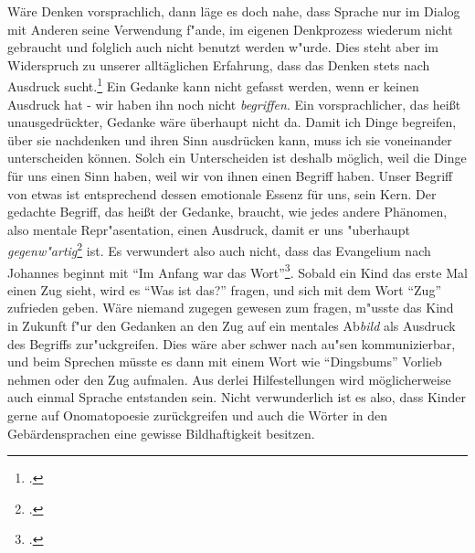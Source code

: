 \documentclass[a4paper, 12pt]{article}
\begin{document}
\begin{onehalfspace}
Wäre Denken vorsprachlich, dann läge es doch nahe, dass Sprache nur im Dialog mit Anderen seine Verwendung f"ande, im eigenen Denkprozess wiederum nicht gebraucht und folglich auch nicht benutzt werden w"urde. Dies steht aber im Widerspruch zu unserer alltäglichen Erfahrung, dass das Denken stets nach Ausdruck sucht.\footnote{\Cite[Vgl.][S. 216]{merleau1966phanomenologie}.} Ein Gedanke kann nicht gefasst werden, wenn er keinen Ausdruck hat - wir haben ihn noch nicht \emph{begriffen}. Ein vorsprachlicher, das heißt unausgedrückter, Gedanke wäre überhaupt nicht da. Damit ich Dinge begreifen, über sie nachdenken und ihren Sinn ausdrücken kann, muss ich sie voneinander unterscheiden können. Solch ein Unterscheiden ist deshalb möglich, weil die Dinge für uns einen Sinn haben, weil wir von ihnen einen Begriff haben. Unser Begriff von etwas ist entsprechend dessen emotionale Essenz für uns, sein Kern. Der gedachte Begriff, das heißt der Gedanke, braucht, wie jedes andere Phänomen, also mentale Repr"asentation, einen Ausdruck, damit er uns "uberhaupt \emph{gegenw"artig}\footnote{\cite[Vgl.][S. 215 f.]{merleau1966phanomenologie}.} ist. Es verwundert also auch nicht, dass das Evangelium nach Johannes beginnt mit "`Im Anfang war das Wort"'\footnote{.}. Sobald ein Kind das erste Mal einen Zug sieht, wird es "`Was ist das?"' fragen, und sich mit dem Wort "`Zug"' zufrieden geben. Wäre niemand zugegen gewesen zum fragen, m"usste das Kind in Zukunft f"ur den Gedanken an den Zug auf ein mentales Ab\emph{bild} als Ausdruck des Begriffs zur"uckgreifen. Dies wäre aber schwer nach au"sen kommunizierbar, und beim Sprechen müsste es dann mit einem Wort wie "`Dingsbums"' Vorlieb nehmen oder den Zug aufmalen. Aus derlei Hilfestellungen wird möglicherweise auch einmal Sprache entstanden sein. Nicht verwunderlich ist es also, dass Kinder gerne auf Onomatopoesie zurückgreifen und auch die Wörter in den Gebärdensprachen eine gewisse Bildhaftigkeit besitzen. 


\end{onehalfspace}
\end{document}
